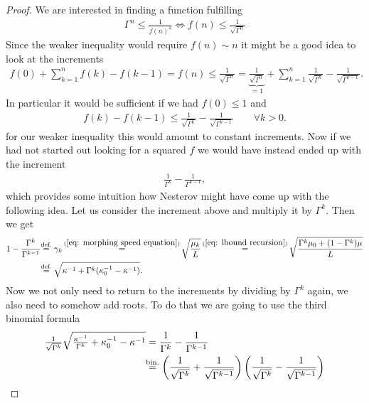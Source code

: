 \begin{proof}
	We are interested in finding a function fulfilling
	\begin{align*}
		\Gamma^n \le \frac{1}{f(n)^2} \iff f(n) \le \frac1{\sqrt{\Gamma^n}}
	\end{align*}
	Since the weaker inequality would require \(f(n)\sim n\) it might be a
	good idea to look at the increments
	\begin{align*}
		f(0) + \sum_{k=1}^n f(k) - f(k-1) = f(n)
		\le \frac{1}{\sqrt{\Gamma^n}}
		= \underbrace{\frac1{\sqrt{\Gamma^0}}}_{=1}
		+ \sum_{k=1}^n\frac{1}{\sqrt{\Gamma^k}}-\frac{1}{\sqrt{\Gamma^{k-1}}}.
	\end{align*}
	In particular it would be sufficient if we had \(f(0) \le 1\) and
	\begin{align*}
		f(k) - f(k-1) \le \frac{1}{\sqrt{\Gamma^k}}-\frac{1}{\sqrt{\Gamma^{k-1}}}
		\qquad \forall k > 0.
	\end{align*}
	for our weaker inequality this would amount to constant increments. Now
	if we had not started out looking for a squared \(f\) we would have instead
	ended up with the increment
	\begin{align*}
		\frac{1}{\Gamma^k}-\frac{1}{\Gamma^{k-1}},
	\end{align*}
	which provides some intuition how Nesterov might have come up with the following	
	idea. Let us consider the increment above and multiply it by \(\Gamma^k\).
	Then we get
	\begin{align*}
		1-\frac{\Gamma^k}{\Gamma^{k-1}}
		&\lxeq{\text{def.}} \gamma_k
		\xeq{(\ref{eq: morphing speed equation})}
		\sqrt{\frac{\lbound_k}{\ubound}} \xeq{(\ref{eq: lbound recursion})}
		\sqrt{\frac{\Gamma^k \lbound_0 + (1-\Gamma^k)\lbound}{\ubound}}\\
		&\lxeq{\text{def.}} \sqrt{\condition^{-1} + \Gamma^k(\condition_0^{-1}-\condition^{-1})}.
	\end{align*}
	Now we not only need to return to the increments by dividing by \(\Gamma^k\)
	again, we also need to somehow add roots. To do that we are going to
	use the third binomial formula
	\begin{align*}
		\tfrac1{\sqrt{\Gamma^k}}
		\sqrt{\tfrac{\condition^{-1}}{\Gamma^k} + \condition_0^{-1}-\condition^{-1}}
		&= \frac{1}{\Gamma^k}-\frac{1}{\Gamma^{k-1}}\\
		&\lxeq{\text{bin.}} 
		\left(
			\frac{1}{\sqrt{\Gamma^k}}+\frac{1}{\sqrt{\Gamma^{k-1}}}
		\right)
		\left(
			\frac{1}{\sqrt{\Gamma^k}}-\frac{1}{\sqrt{\Gamma^{k-1}}}
		\right) \\

\end{align*}
\end{proof}
